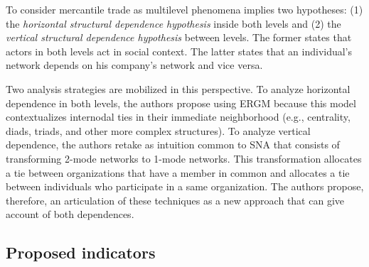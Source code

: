 \documentclass[a4paper, 12pt, openright, oneside, german, french, brazil, english, article]{abntex2}
\begin{document}
	To consider mercantile trade as multilevel phenomena implies two hypotheses: (1) the \textit{horizontal structural dependence hypothesis} inside both levels and (2) the \textit{vertical structural dependence hypothesis} between levels. The former states that actors in both levels act in social context. The latter states that an individual's network depends on his company's network and vice versa.
	
	
	Two analysis strategies are mobilized in this perspective. To analyze horizontal dependence in both levels, the authors propose using ERGM because this model contextualizes internodal ties in their immediate neighborhood (e.g., centrality, diads, triads, and other more complex structures). To analyze vertical dependence, the authors retake as intuition common to SNA that consists of transforming 2-mode networks to 1-mode networks. This transformation allocates a tie between organizations that have a member in common and allocates a tie between individuals who participate in a same organization. The authors propose, therefore, an articulation of these techniques as a new approach that can give account of both dependences.
	
	
	\subsection{Proposed indicators}
	
\end{document}
